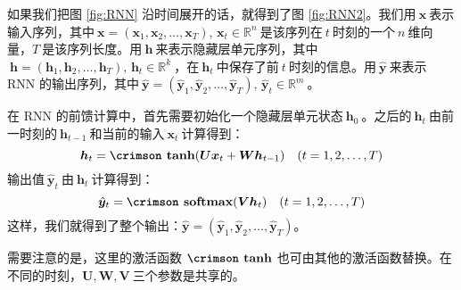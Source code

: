 \documentclass[12pt,a4paper]{article}
\begin{document}
如果我们把图 {\kai \ref{fig:RNN}} 沿时间展开的话，就得到了图 {\kai \ref{fig:RNN2}}。我们用$\:\bm{\mathbf{x}}\:$表示输入序列，其中$\:\bm{\mathbf{x}}=(\bm{x}_1,\bm{x}_2,\ldots,\bm{x}_T),\, \bm{x}_t \in \mathbb{R}^n\:$是该序列在$\:t\:$时刻的一个$\:n\:$维向量，$T\:$是该序列长度。用$\:\bm{\mathbf{h}}\:$来表示隐藏层单元序列，其中$\:\bm{\mathbf{h}}=(\bm{h}_1,\bm{h}_2,\ldots,\bm{h}_T),\, \bm{h}_t \in \mathbb{R}^k\:$，在$\:\bm{h}_t\:$中保存了前$\:t\:$时刻的信息。用$\:\hat{\bm{\mathbf{y}}}\:$来表示 {\crimson RNN} 的输出序列，其中$\:\hat{\bm{\mathbf{y}}}=(\hat{\bm{y}}_1,\hat{\bm{y}}_2,\ldots,\hat{\bm{y}}_T),\, \hat{\bm{y}}_t \in \mathbb{R}^m\:$。

在 {\crimson RNN} 的前馈计算中，首先需要初始化一个隐藏层单元状态$\:\bm{h}_0\:$。之后的$\:\bm{h}_t\:$由前一时刻的$\:\bm{h}_{t-1}\:$和当前的输入$\:\bm{x}_t\:$计算得到：
\begin{equation}
\bm{h}_t = \textbf{\crimson tanh}(\bm{U}\bm{x}_t + \bm{W}\bm{h}_{t-1})\quad (t = 1,2,\ldots,T)
\end{equation}
输出值$\:\hat{\bm{y}}_t\:$由$\:\bm{h}_t\:$计算得到：
\begin{equation}
\hat{\bm{y}}_t = \textbf{\crimson softmax}(\bm{V}\bm{h}_t) \quad (t = 1,2,\ldots,T)
\end{equation}
这样，我们就得到了整个输出：$\hat{\bm{\mathbf{y}}}=(\hat{\bm{y}}_1,\hat{\bm{y}}_2,\ldots,\hat{\bm{y}}_T)$。

需要注意的是，这里的激活函数 $\textbf{{\crimson tanh}}$ 也可由其他的激活函数替换。在不同的时刻，$\bm{U},\bm{W},\bm{V}\:$三个参数是共享的。
\end{document}
